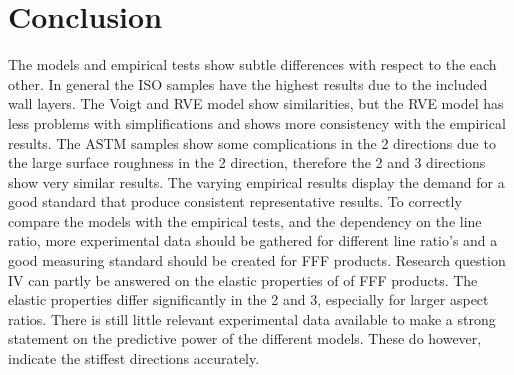 \section{Conclusion}
The models and empirical tests show subtle differences with respect to the each other. In general the ISO samples have the highest results due to the included wall layers. The Voigt and RVE model show similarities, but the RVE model has less problems with simplifications and shows more consistency with the empirical results. The ASTM samples show some complications  in the 2 directions due to the large surface roughness in the 2 direction, therefore the 2 and 3 directions show very similar results.
The varying empirical results display the demand for a good standard that produce consistent representative results. To correctly compare the models with the empirical tests, and the dependency on the line ratio, more experimental data should be gathered for different line ratio's and a good measuring standard should be created for FFF products.
Research question IV can partly be answered on the elastic properties of of FFF products. The elastic properties differ significantly in the 2 and 3, especially for larger aspect ratios. There is still little relevant experimental data available to make a strong statement on the predictive power of the different models. These do however, indicate the stiffest directions accurately. 


